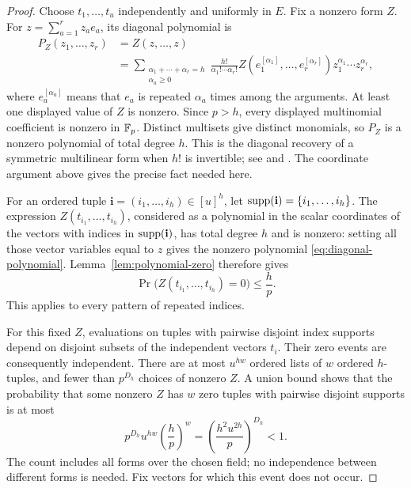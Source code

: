\begin{proof}
Choose $t_1,\ldots,t_u$ independently and uniformly in $E$.  Fix a
nonzero form $Z$.  For $z=\sum_{a=1}^r z_a e_a$, its diagonal polynomial
is
\begin{equation}
  \begin{aligned}
  P_Z(z_1,\ldots,z_r)&=Z(z,\ldots,z)\\
  &=\sum_{\substack{\alpha_1+\cdots+\alpha_r=h\\\alpha_a\ge0}}
    \frac{h!}{\alpha_1!\cdots\alpha_r!}
    Z(e_1^{[\alpha_1]},\ldots,e_r^{[\alpha_r]})
    z_1^{\alpha_1}\cdots z_r^{\alpha_r},
  \end{aligned}
  \label{eq:diagonal-polynomial}
\end{equation}
where $e_a^{[\alpha_a]}$ means that $e_a$ is repeated $\alpha_a$ times
among the arguments.  At least one displayed value of $Z$ is nonzero.
Since $p>h$, every displayed multinomial coefficient is nonzero in
$\mathbb F_p$.  Distinct multisets give distinct monomials, so $P_Z$ is a
nonzero polynomial of total degree $h$.
This is the diagonal recovery of a symmetric multilinear form when
$h!$ is invertible; see \cite[Corollary~1.2]{FerreroMicali1979} and
\cite[Proposition~3.3]{DrapalVojtechovsky2009}. The coordinate argument
above gives the precise fact needed here.

For an ordered tuple $\mathbf i=(i_1,\ldots,i_h)\in[u]^h$, let
$\operatorname{supp}(\mathbf i)=\{i_1,\ldots,i_h\}$.  The expression
$Z(t_{i_1},\ldots,t_{i_h})$, considered as a polynomial in the scalar
coordinates of the vectors with indices in $\operatorname{supp}(\mathbf i)$, has total
degree $h$ and is nonzero: setting all those vector variables equal to
$z$ gives the nonzero polynomial \eqref{eq:diagonal-polynomial}.
Lemma~\ref{lem:polynomial-zero} therefore gives
\begin{equation}
  \Pr\bigl(Z(t_{i_1},\ldots,t_{i_h})=0\bigr)\le\frac hp.
  \label{eq:tuple-zero-probability}
\end{equation}
This applies to every pattern of repeated indices.

For this fixed $Z$, evaluations on tuples with pairwise disjoint index
supports depend on disjoint subsets of the independent vectors $t_i$.
Their zero events are consequently independent.  There are at most
$u^{hw}$ ordered lists of $w$ ordered $h$-tuples, and fewer than
$p^{D_h}$ choices of nonzero $Z$.  A union bound shows that the probability
that some nonzero $Z$ has $w$ zero tuples with pairwise disjoint supports
is at most
\begin{equation}
  p^{D_h}u^{hw}\left(\frac hp\right)^w
  =\left(\frac{h^2u^{2h}}p\right)^{D_h}<1.
  \label{eq:field-union-bound}
\end{equation}
The count includes all forms over the chosen field; no independence
between different forms is needed.  Fix vectors for which this event
does not occur.


\end{proof}
